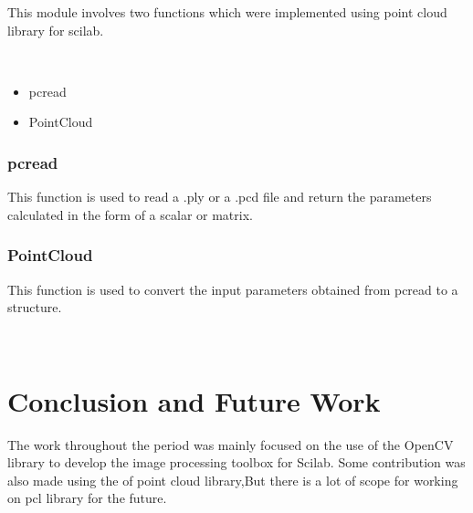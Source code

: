 \documentclass[12pt]{report}
\begin{document}
 \justify
 This module involves two functions which were implemented using point cloud library for scilab.
 
 \\
  
 \begin{itemize}
	\item pcread
   	\item PointCloud
 \end{itemize}
  
 \subsection{pcread}

 \justify
  This function is used to read a .ply or a .pcd file and return the parameters calculated in the form of a scalar or matrix.
  \\

  \subsection{PointCloud}
  This function is used to convert the input parameters obtained from pcread to a structure.

  \\

 \chapter{Conclusion and Future Work}

 \justify
  The work throughout the period was mainly focused on the use of the OpenCV library to develop the image processing toolbox for Scilab.
  Some contribution was also made using the of point cloud library,But there is a lot of scope for working on pcl library for the future.
\end{document}
